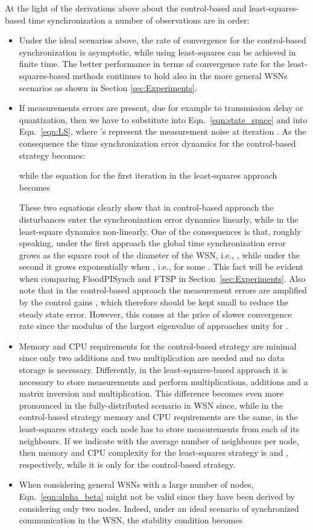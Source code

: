\documentclass[english,a4paper,10pt,final]{article}
\numberwithin{equation}{section}
\numberwithin{figure}{section}
\begin{document}
At the light of the derivations above about the control-based and least-squares-based time synchronization a number of observations are in order:
\begin{itemize}
\item Under the ideal scenarios above, the rate of convergence for the control-based synchronization is asymptotic, while using least-squares can be achieved in finite time. The better performance in terms of convergence rate for the least-squares-based methods continues to hold also in the more general WSNs scenarios as shown in Section \ref{sec:Experiments}.
\item If measurements errors are present, due for example to transmission delay or quantization, then we have to substitute   into Eqn.~\eqref{eqn:state_space} and  into Eqn.~\eqref{eqn:LS}, where 's represent the measurement noise at iteration . As the consequence the time synchronization error dynamics for the control-based strategy becomes:

while the equation  for the first iteration in the least-squares approach becomes

These two equations clearly show that in control-based approach the disturbances enter the synchronization error dynamics linearly, while in the least-square dynamics non-linearly. One of the consequences is that, roughly speaking, under the first approach the global time synchronization error grows as the square root of the diameter  of the WSN, i.e., , while under the second it grows exponentially when , i.e.,
 for some . This fact will be evident when comparing FloodPISynch and FTSP in Section~\ref{sec:Experiments}. Also note that in the control-based approach the measurement errors are amplified by the control gains , which therefore should be kept small to reduce the steady state error. However, this comes at the price of slower convergence rate since the modulus of the largest eigenvalue of  approaches unity for .

\item Memory and CPU requirements for the control-based strategy are minimal since only two additions and two multiplication are needed and no data storage is necessary. Differently, in the least-squares-based approach it is necessary to store  measurements and perform  multiplications,  additions and a  matrix inversion and multiplication. This difference becomes even more pronounced in the fully-distributed scenario in WSN since, while in the control-based strategy memory and CPU requirements are the same, in the least-squares strategy each node has to store  measurements from each of its neighbours. If we indicate with  the average number of neighbours per node, then memory and CPU complexity for the least-squares strategy is  and , respectively, while it is only  for the control-based strategy. 

\item When considering general WSNs with a large number of nodes, Eqn.~\eqref{eqn:alpha_beta} might not be valid since they have been derived by considering only two nodes. Indeed, under an ideal scenario of synchronized communication in the WSN, the stability condition becomes

\end{itemize} 
\end{document}
